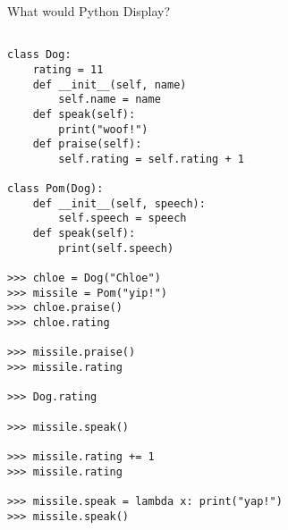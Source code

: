 \begin{blocksection}
\question What would Python Display?
\begin{lstlisting}

class Dog:
    rating = 11
    def __init__(self, name)
        self.name = name
    def speak(self):
        print("woof!")
    def praise(self):
        self.rating = self.rating + 1
		
class Pom(Dog):
    def __init__(self, speech):
        self.speech = speech
    def speak(self):
        print(self.speech)

>>> chloe = Dog("Chloe")
>>> missile = Pom("yip!")
>>> chloe.praise()
>>> chloe.rating

>>> missile.praise()
>>> missile.rating

>>> Dog.rating

>>> missile.speak()

>>> missile.rating += 1
>>> missile.rating

>>> missile.speak = lambda x: print("yap!")
>>> missile.speak()
\end{lstlisting}
\end{blocksection}
